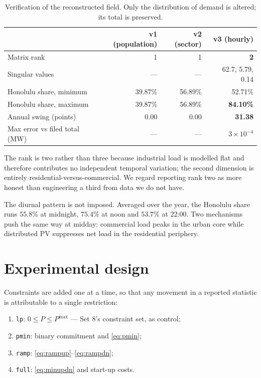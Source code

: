 \documentclass[11pt,a4paper]{article}
\theoremstyle{definition}
\theoremstyle{plain}
\theoremstyle{remark}
\begin{document}
\begin{table}[htbp]
\centering
\caption{Verification of the reconstructed field. Only the distribution of
demand is altered; its total is preserved.}
\label{tab:verify}
\small
\begin{tabular}{lrrr}
\toprule
 & v1 (population) & v2 (sector) & v3 (hourly) \\
\midrule
Matrix rank                       & 1 & 1 & \textbf{2} \\
Singular values                   & --- & --- & 62.7, 5.79, 0.14 \\
Honolulu share, minimum           & 39.87\% & 56.89\% & 52.71\% \\
Honolulu share, maximum           & 39.87\% & 56.89\% & \textbf{84.10\%} \\
Annual swing (points)             & 0.00 & 0.00 & \textbf{31.38} \\
Max error vs filed total (\si{\mega\watt}) & --- & --- & $3\times10^{-4}$ \\
\bottomrule
\end{tabular}
\end{table}

The rank is two rather than three because industrial load is modelled flat and
therefore contributes no independent temporal variation; the second dimension
is entirely residential-versus-commercial. We regard reporting rank two as more
honest than engineering a third from data we do not have.

The diurnal pattern is not imposed. Averaged over the year, the Honolulu share
runs $55.8\%$ at midnight, $75.4\%$ at noon and $53.7\%$ at 22:00. Two
mechanisms push the same way at midday: commercial load peaks in the urban core
while distributed PV suppresses net load in the residential periphery.

\section{Experimental design}
\label{sec:ladder}

Constraints are added one at a time, so that any movement in a reported
statistic is attributable to a single restriction:
\begin{enumerate}[label=(\roman*),leftmargin=2.2em,itemsep=1pt]
\item \texttt{lp}: $0 \le P \le P^{\max}$ --- Set 8's constraint set, as control;
\item \texttt{pmin}: binary commitment and \eqref{eq:pmin};
\item \texttt{ramp}: \eqref{eq:rampup}--\eqref{eq:rampdn};
\item \texttt{full}: \eqref{eq:minupdn} and start-up costs.
\end{enumerate}
\end{document}
